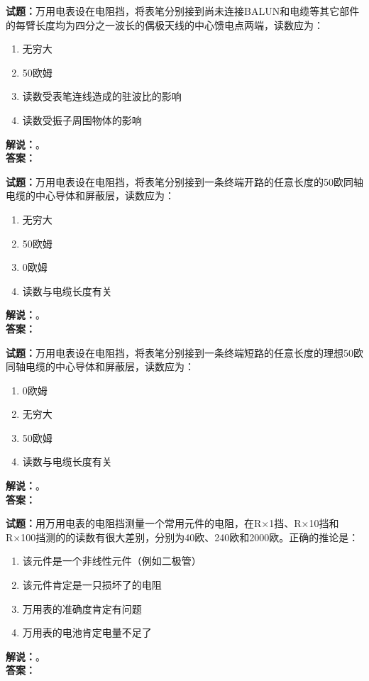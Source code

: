 \documentclass{ctexbook}
\begin{document}
\bigskip

\noindent\textbf{试题：}万用电表设在电阻挡，将表笔分别接到尚未连接BALUN和电缆等其它部件的每臂长度均为四分之一波长的偶极天线的中心馈电点两端，读数应为：
\begin{enumerate}[leftmargin=3em]
  \item 无穷大
  \item 50欧姆
  \item 读数受表笔连线造成的驻波比的影响
  \item 读数受振子周围物体的影响
\end{enumerate}
\noindent\textbf{解说：}\textbf{}。\\\noindent\textbf{答案：}

\bigskip

\noindent\textbf{试题：}万用电表设在电阻挡，将表笔分别接到一条终端开路的任意长度的50欧同轴电缆的中心导体和屏蔽层，读数应为：
\begin{enumerate}[leftmargin=3em]
  \item 无穷大
  \item 50欧姆
  \item 0欧姆
  \item 读数与电缆长度有关
\end{enumerate}
\noindent\textbf{解说：}\textbf{}。\\\noindent\textbf{答案：}

\bigskip

\noindent\textbf{试题：}万用电表设在电阻挡，将表笔分别接到一条终端短路的任意长度的理想50欧同轴电缆的中心导体和屏蔽层，读数应为：
\begin{enumerate}[leftmargin=3em]
  \item 0欧姆
  \item 无穷大
  \item 50欧姆
  \item 读数与电缆长度有关
\end{enumerate}
\noindent\textbf{解说：}\textbf{}。\\\noindent\textbf{答案：}

\bigskip

\noindent\textbf{试题：}用万用电表的电阻挡测量一个常用元件的电阻，在R×1挡、R×10挡和R×100挡测的的读数有很大差别，分别为40欧、240欧和2000欧。正确的推论是：
\begin{enumerate}[leftmargin=3em]
  \item 该元件是一个非线性元件（例如二极管）
  \item 该元件肯定是一只损坏了的电阻
  \item 万用表的准确度肯定有问题
  \item 万用表的电池肯定电量不足了
\end{enumerate}
\noindent\textbf{解说：}\textbf{}。\\\noindent\textbf{答案：}
\end{document}
